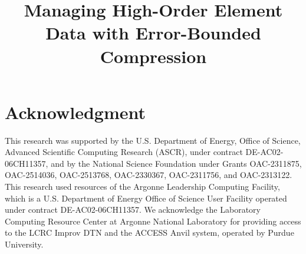 \documentclass[conference]{IEEEtran}
\begin{document}
\title{Managing High-Order Element Data with Error-Bounded Compression}

\author{
}

\maketitle











\section*{Acknowledgment}
This research was supported by the U.S. Department of Energy, Office of Science, Advanced Scientific Computing Research (ASCR), under contract DE-AC02-06CH11357, and by the National Science Foundation under Grants OAC-2311875, OAC-2514036, OAC-2513768, OAC-2330367, OAC-2311756, and OAC-2313122.
This research used resources of the Argonne Leadership Computing Facility, which is a U.S. Department of Energy Office of Science User Facility operated under contract DE-AC02-06CH11357.
We acknowledge the Laboratory Computing Resource Center at Argonne National Laboratory for providing access to the LCRC Improv DTN and the ACCESS Anvil system, operated by Purdue University.
\end{document}
